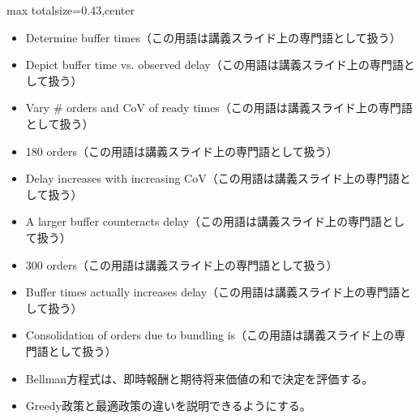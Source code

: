 \clearpage
{}
\begin{minipage}[t]{0.405\textwidth}
\begin{adjustbox}{max totalsize={\textwidth}{0.43\textheight},center}
\begin{minipage}{\textwidth}\scriptsize
{}\begin{itemize}
\item Determine buffer times（この用語は講義スライド上の専門語として扱う）
\item Depict buffer time vs. observed delay（この用語は講義スライド上の専門語として扱う）
\item Vary \# orders and CoV of ready times（この用語は講義スライド上の専門語として扱う）
\item 180 orders（この用語は講義スライド上の専門語として扱う）
\item Delay increases with increasing CoV（この用語は講義スライド上の専門語として扱う）
\item A larger buffer counteracts delay（この用語は講義スライド上の専門語として扱う）
\item 300 orders（この用語は講義スライド上の専門語として扱う）
\item Buffer times actually increases delay（この用語は講義スライド上の専門語として扱う）
\item Consolidation of orders due to bundling is（この用語は講義スライド上の専門語として扱う）
\end{itemize}\begin{itemize}
\item Bellman方程式は、即時報酬と期待将来価値の和で決定を評価する。
\item Greedy政策と最適政策の違いを説明できるようにする。
\end{itemize}
\end{minipage}
\end{adjustbox}
\end{minipage}\hfill
